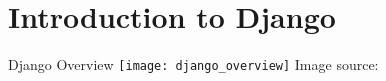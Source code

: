 \section{Introduction to Django}




\begin{frame}{Django Overview}
    \texttt{[image: django\_overview]}
    Image source: \cite{overview}
\end{frame}


